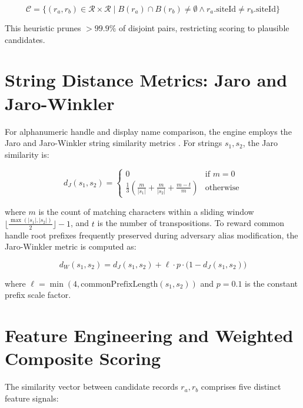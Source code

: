\begin{equation}
\mathcal{C} = \big\{ (r_a, r_b) \in \mathcal{R} \times \mathcal{R} \mid B(r_a) \cap B(r_b) \neq \emptyset \land r_a.\text{siteId} \neq r_b.\text{siteId} \big\}
\end{equation}

This heuristic prunes $>99.9\%$ of disjoint pairs, restricting scoring to plausible candidates.

\section{String Distance Metrics: Jaro and Jaro-Winkler}
\label{sec:string_metrics}

For alphanumeric handle and display name comparison, the engine employs the Jaro and Jaro-Winkler string similarity metrics \cite{jaro1989advances, winkler1990string, navarro2001guided}. For strings $s_1, s_2$, the Jaro similarity is:

\begin{equation}
\label{eq:jaro}
d_J(s_1, s_2) = \begin{cases}
0 & \text{if } m = 0 \\
\frac{1}{3} \left( \frac{m}{|s_1|} + \frac{m}{|s_2|} + \frac{m - t}{m} \right) & \text{otherwise}
\end{cases}
\end{equation}

where $m$ is the count of matching characters within a sliding window $\lfloor \frac{\max(|s_1|, |s_2|)}{2} \rfloor - 1$, and $t$ is the number of transpositions. To reward common handle root prefixes frequently preserved during adversary alias modification, the Jaro-Winkler metric is computed as:

\begin{equation}
\label{eq:jaro_winkler}
d_W(s_1, s_2) = d_J(s_1, s_2) + \ell \cdot p \cdot \big(1 - d_J(s_1, s_2)\big)
\end{equation}

where $\ell = \min(4, \text{commonPrefixLength}(s_1, s_2))$ and $p = 0.1$ is the constant prefix scale factor.

\section{Feature Engineering and Weighted Composite Scoring}
\label{sec:composite_scoring}

The similarity vector between candidate records $r_a, r_b$ comprises five distinct feature signals:

